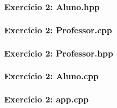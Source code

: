 \documentclass[aspectratio=169]{beamer}
\begin{document}
\begin{frame}[fragile]\frametitle{Exercício 2: Aluno.hpp}

\end{frame}

\begin{frame}[fragile]\frametitle{Exercício 2: Professor.cpp}
\fontsize{3pt}{5pt}\selectfont{

}
\end{frame}

\begin{frame}[fragile]\frametitle{Exercício 2: Professor.hpp}

\end{frame}

\begin{frame}[fragile]\frametitle{Exercício 2: Aluno.cpp}
\fontsize{3pt}{5pt}\selectfont{

}
\end{frame}

\begin{frame}[fragile]\frametitle{Exercício 2: app.cpp}

\end{frame}

\end{document}
